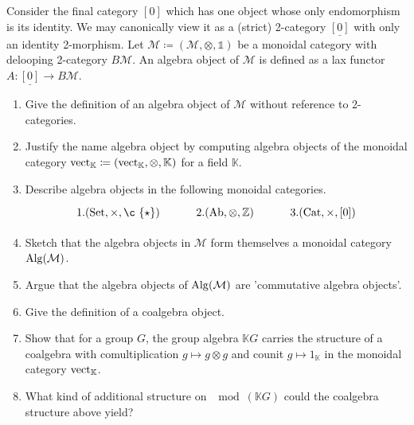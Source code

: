 \begin{Exercise}
	Consider the final category $ [ 0 ] $ which has one object whose only endomorphism is its identity.
	We may canonically view it as a (strict) 2-category $ \underline{ [ 0 ] } $ with only an identity 2-morphism.
	Let $ \mathcal{ M } \coloneqq( \mathcal{ M } , \otimes , \mathds{ 1 } ) $ be a monoidal category with delooping 2-category $ B \mathcal{ M } $. 
	An algebra object of $ \mathcal{ M } $ is defined as a lax functor $ A \colon \underline{ [ 0 ] } \to B \mathcal{ M } $. 
	\begin{enumerate}[label=(\alph*)]
		\item 
		Give the definition of an algebra object of $ \mathcal{ M } $ without reference to 2-categories.
		
		\item 
		Justify the name algebra object by computing algebra objects of the monoidal category $ \operatorname{vect}_{ \mathbb{ K } } \coloneqq ( \operatorname{vect}_{ \mathbb{ K } }, \otimes , \mathbb{ K } ) $ for a field $ \mathbb{ K } $.
		
		\item 
		Describe algebra objects in the following monoidal categories.
		\[
		\begin{tikzcd}
			1. ( \set , \times , ¸\{ \star \} ) 
			&
			2. ( \Ab , \otimes, \mathbb{ Z } )
			&
			3. ( \Cat , \times, [ 0 ] )
		\end{tikzcd}
		\]
		
		\item 
		Sketch that the algebra objects in $ \mathcal{ M } $ form themselves a monoidal category $ \operatorname{Alg} ( \mathcal{ M } ) $.
		
		\item 
		Argue that the algebra objects of $ \operatorname{Alg} ( \mathcal{ M } ) $ are 'commutative algebra objects'.
		
		\item 
		Give the definition of a coalgebra object.
		
		\item 
		Show that for a group $ G $, the group algebra $ \mathbb{ K } G $ carries the structure of a coalgebra with comultiplication $ g \mapsto g \otimes g $ and counit $ g \mapsto 1_{ \mathbb{K} }$ in the monoidal category $ \operatorname{vect}_{ \mathbb{ K } }$.
		
		\item 
		What kind of additional structure on $ \mod ( \mathbb{ K } G ) $ could the coalgebra structure above yield?
	\end{enumerate}
\end{Exercise}

